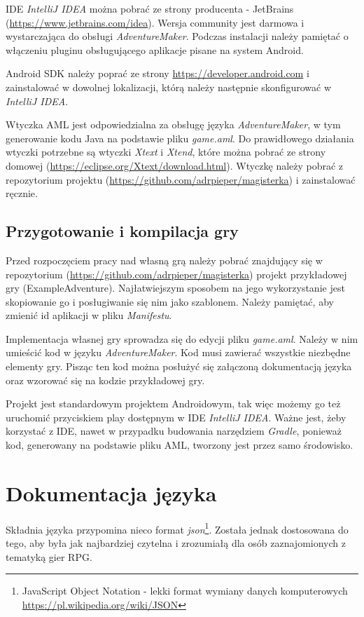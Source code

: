 \documentclass[openright]{xmgr}
\begin{document}
IDE \textit{IntelliJ IDEA} można pobrać ze strony producenta - JetBrains (\url{https://www.jetbrains.com/idea}). Wersja community jest darmowa i wystarczająca do obsługi \textit{AdventureMaker}. Podczas instalacji należy pamiętać o włączeniu pluginu obsługującego aplikacje pisane na system Android.

Android SDK  należy poprać ze strony \url{https://developer.android.com} i zainstalować w dowolnej lokalizacji, którą należy następnie skonfigurować w \textit{IntelliJ IDEA}.

Wtyczka AML jest odpowiedzialna za obsługę języka \textit{AdventureMaker}, w tym generowanie kodu Java na podstawie pliku \textit{game.aml}. Do prawidłowego działania wtyczki potrzebne są wtyczki \textit{Xtext} i \textit{Xtend}, które można pobrać ze strony domowej (\url{https://eclipse.org/Xtext/download.html}).
Wtyczkę należy pobrać z repozytorium projektu (\url{https://github.com/adrpieper/magisterka}) i zainstalować ręcznie.

\section{Przygotowanie i kompilacja gry}
Przed rozpoczęciem pracy nad własną grą należy pobrać znajdujący się w repozytorium (\url{https://github.com/adrpieper/magisterka}) projekt przykładowej gry (ExampleAdventure). Najłatwiejszym sposobem na jego wykorzystanie jest skopiowanie go i posługiwanie się nim jako szablonem. Należy pamiętać, aby zmienić id aplikacji w pliku \textit{Manifestu}.

Implementacja własnej gry sprowadza się do edycji pliku \textit{game.aml}. Należy w nim umieścić kod w języku \textit{AdventureMaker}. Kod musi  zawierać wszystkie niezbędne elementy gry. Pisząc ten kod można posłużyć się załączoną dokumentacją języka oraz wzorować się na kodzie przykładowej gry.

Projekt jest standardowym projektem Androidowym, tak więc możemy go też uruchomić przyciskiem play dostępnym w IDE \textit{IntelliJ IDEA}. Ważne jest, żeby korzystać z IDE, nawet w przypadku budowania narzędziem \textit{Gradle}, ponieważ kod, generowany na podstawie pliku AML, tworzony jest przez samo środowisko.

\chapter{Dokumentacja języka} 

Składnia języka przypomina nieco format \textit{json}\footnote{JavaScript Object Notation - lekki format wymiany danych komputerowych \url{https://pl.wikipedia.org/wiki/JSON}}. Została jednak dostosowana do tego, aby była jak najbardziej czytelna i zrozumiałą dla osób zaznajomionych z tematyką gier RPG.
\end{document}
